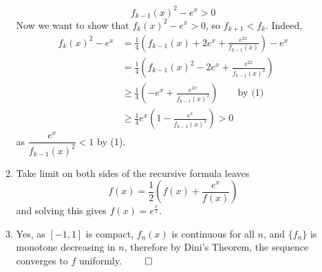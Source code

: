 \begin{enumerate}
\begin{enumerate}
\[        \]
        \begin{equation*}
        f_{k-1}(x)^2 - e^x > 0 \tag{1}
        \end{equation*}
        Now we want to show that $f_k(x)^2 - e^x > 0$, so $f_{k+1} < f_{k}$. Indeed,
        \begin{align*}
            f_k(x)^2 - e^x &= \frac{1}{4}\left(f_{k-1}(x) + 2e^x + \frac{e^{2x}}{f_{k-1}(x)}\right) - e^x \\
            &= \frac{1}{4}\left(f_{k-1}(x)^2 - 2e^x + \frac{e^{2x}}{f_{k-1}(x)^2}\right) \\
            &\geq \frac{1}{4}\left(- e^x + \frac{e^{2x}}{f_{k-1}(x)^2}\right) \quad \quad \text{by (1)} \\
            &\geq \frac{1}{4}e^x\left(1 - \frac{e^x}{f_{k-1}(x)^2}\right) > 0
        \end{align*}
        as $\dfrac{e^x}{f_{k-1}(x)^2} < 1$ by (1).
        \item Take limit on both sides of the recursive formula leaves
        \[
        f(x) = \frac{1}{2} \left( f(x) + \frac{e^x}{f(x)} \right)
        \]
        and solving this gives $f(x) = e^{\frac{x}{2}}$.
        \item Yes, as $[-1,1]$ is compact, $f_n(x)$ is continuous for all $n$, and $\{f_n\}$ is monotone decreasing in $n$, therefore by Dini's Theorem, the sequence converges to $f$ uniformly. $\qed$
    \end{enumerate}
\end{enumerate}
